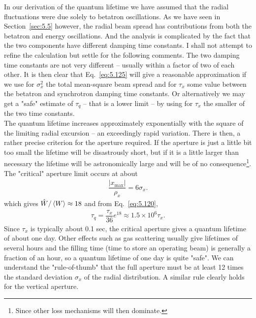 In our derivation of the quantum lifetime we have assumed that the radial fluctuations were due solely to betatron oscillations. As we have seen in Section~\ref{sec:5.5} however, the radial beam spread has contributions from both the betatron and energy oscillations. And the analysis is complicated by the fact that the two components have different damping time constants. I shall not attempt to refine the calculation but settle for the following comments. The two damping time constants are not very different -- usually within a factor of two of each other. It is then clear that Eq.~\eqref{eq:5.125} will give a reasonable approximation if we use for $\sigma_x^2$ the total mean-square beam spread and for $\tau_x$ some value between the betatron and synchrotron damping time constants. Or alternatively we may get a "safe" estimate of $\tau_q$ -- that is a lower limit -- by using for $\tau_x$ the smaller of the two time constants.\\
The quantum lifetime increases approximately exponentially with the square of the limiting radial excursion -- an exceedingly rapid variation. There is then, a rather precise criterion
 for the aperture required. If the aperture is just a little bit too small the lifetime will be disastrously short, but if it is a little larger than necessary the lifetime will be astronomically large and will be of no consequence\footnote{Since other loss mechanisms
 will then dominate.}. The "critical" aperture limit occurs at about
\begin{align}
	\dfrac{|x_\text{max}|}{\rho_x} = 6\sigma_x.
\end{align}
which gives $\hat{W}/\left< W \right> \approx 18$ and from Eq.~\eqref{eq:5.120},
\begin{align}
	\tau_q = \dfrac{\tau_x}{36} e^{18} \approx 1.5 \times 10^6 \tau_x.
\end{align}
Since $\tau_x$ is typically about 0.1 sec, the critical aperture gives a quantum lifetime
of about one day. Other effects such as gas scattering usually give lifetimes of several hours and the filling time (time to store an operating beam) is generally a fraction of an hour, so a quantum lifetime of one day is quite "safe". We can understand the "rule-of-thumb" that the full aperture must be at least 12 times the standard deviation $\sigma_x$ of the radial distribution. A similar rule clearly holds for the vertical aperture.


